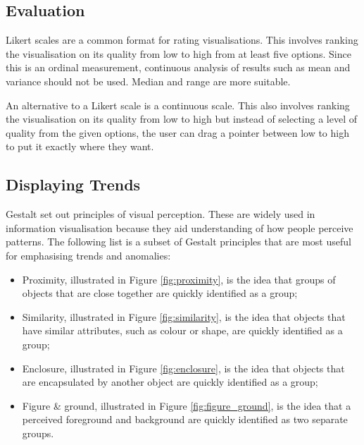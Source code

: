		\subsection{Evaluation}
			Likert scales are a common format for rating visualisations\cite{likert_scale_allen}. This involves ranking the visualisation on its quality from low to high from at least five options. Since this is an ordinal measurement, continuous analysis of results such as mean and variance should not be used. Median and range are more suitable.
			
			An alternative to a Likert scale is a continuous scale. This also involves ranking the visualisation on its quality from low to high but instead of selecting a level of quality from the given options, the user can drag a pointer between low to high to put it exactly where they want.
		\subsection{Displaying Trends}
			Gestalt set out principles of visual perception. These are widely used in information visualisation because they aid understanding of how people perceive patterns\cite{gestalt_graph_kobourov}. The following list is a subset of Gestalt principles that are most useful for emphasising trends and anomalies:
			
			\begin{itemize}
				\item Proximity, illustrated in Figure \ref{fig:proximity}, is the idea that groups of objects that are close together are quickly identified as a group;
				\item Similarity, illustrated in Figure \ref{fig:similarity}, is the idea that objects that have similar attributes, such as colour or shape, are quickly identified as a group;
				\item Enclosure, illustrated in Figure \ref{fig:enclosure}, is the idea that objects that are encapsulated by another object are quickly identified as a group;
				\item Figure \& ground, illustrated in Figure \ref{fig:figure_ground}, is the idea that a perceived foreground and background are quickly identified as two separate groups. 
			\end{itemize}
			
